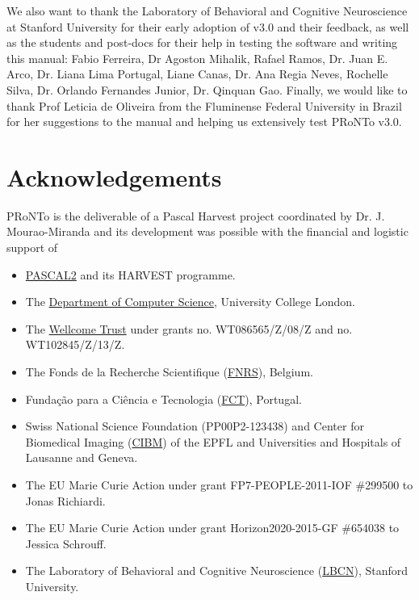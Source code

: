 \begin{description}
\end{description}

We also want to thank the Laboratory of Behavioral and Cognitive Neuroscience at Stanford University for their early adoption of v3.0 and their feedback, as well as the students and post-docs for their help in testing the software and writing this manual: Fabio Ferreira, Dr Agoston Mihalik, Rafael Ramos, Dr. Juan E. Arco, Dr. Liana Lima Portugal, Liane Canas, Dr. Ana Regia Neves, Rochelle Silva, Dr. Orlando Fernandes Junior, Dr. Qinquan Gao. Finally, we would like to thank Prof Leticia de Oliveira from the Fluminense Federal University in Brazil for her suggestions to the manual and helping us extensively test PRoNTo v3.0.


\section{Acknowledgements}
PRoNTo is the deliverable of a Pascal Harvest project coordinated by Dr. J. Mourao-Miranda and its development was possible with the financial and logistic support of 
\begin{itemize}
\item \href{https://cordis.europa.eu/project/id/216886}{PASCAL2} and its HARVEST programme.
\item The \href{http://www.cs.ucl.ac.uk}{Department of Computer Science}, University College London.
\item The \href{http://www.wellcome.org/}{Wellcome Trust} under grants no. WT086565/Z/08/Z and no. WT102845/Z/13/Z.
\item The Fonds de la Recherche Scientifique (\href{http://www.fnrs.be}{FNRS}), Belgium.
\item Funda\c{c}\~{a}o para a Ci\^{e}ncia e Tecnologia (\href{http://www.fct.pt}{FCT}), Portugal.
\item Swiss National Science Foundation (PP00P2-123438) and Center for   Biomedical Imaging (\href{https://cibm.ch/}{CIBM}) of the EPFL and Universities and Hospitals of Lausanne and Geneva.
\item The EU Marie Curie Action under grant FP7-PEOPLE-2011-IOF \#299500 to Jonas Richiardi.
\item The EU Marie Curie Action under grant Horizon2020-2015-GF \#654038 to Jessica Schrouff.
\item The Laboratory of Behavioral and Cognitive Neuroscience (\href{https://med.stanford.edu/parvizi-lab.html}{LBCN}), Stanford University.
\end{itemize}

